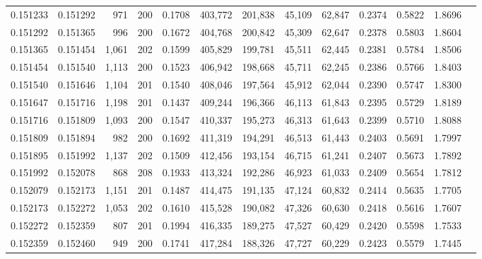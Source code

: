 \begin{tabular}{rrrrrrrrrrrrr}
0.151233 & 0.151292 &   971 & 200 &                                     0.1708 & 403,772 & 201,838 &  45,109 &  62,847 & 0.2374 & 0.5822 & 1.8696 \\
0.151292 & 0.151365 &   996 & 200 &                                     0.1672 & 404,768 & 200,842 &  45,309 &  62,647 & 0.2378 & 0.5803 & 1.8604 \\
0.151365 & 0.151454 & 1,061 & 202 &                                     0.1599 & 405,829 & 199,781 &  45,511 &  62,445 & 0.2381 & 0.5784 & 1.8506 \\
0.151454 & 0.151540 & 1,113 & 200 &                                     0.1523 & 406,942 & 198,668 &  45,711 &  62,245 & 0.2386 & 0.5766 & 1.8403 \\
0.151540 & 0.151646 & 1,104 & 201 &                                     0.1540 & 408,046 & 197,564 &  45,912 &  62,044 & 0.2390 & 0.5747 & 1.8300 \\
0.151647 & 0.151716 & 1,198 & 201 &                                     0.1437 & 409,244 & 196,366 &  46,113 &  61,843 & 0.2395 & 0.5729 & 1.8189 \\
0.151716 & 0.151809 & 1,093 & 200 &                                     0.1547 & 410,337 & 195,273 &  46,313 &  61,643 & 0.2399 & 0.5710 & 1.8088 \\
0.151809 & 0.151894 &   982 & 200 &                                     0.1692 & 411,319 & 194,291 &  46,513 &  61,443 & 0.2403 & 0.5691 & 1.7997 \\
0.151895 & 0.151992 & 1,137 & 202 &                                     0.1509 & 412,456 & 193,154 &  46,715 &  61,241 & 0.2407 & 0.5673 & 1.7892 \\
0.151992 & 0.152078 &   868 & 208 &                                     0.1933 & 413,324 & 192,286 &  46,923 &  61,033 & 0.2409 & 0.5654 & 1.7812 \\
0.152079 & 0.152173 & 1,151 & 201 &                                     0.1487 & 414,475 & 191,135 &  47,124 &  60,832 & 0.2414 & 0.5635 & 1.7705 \\
0.152173 & 0.152272 & 1,053 & 202 &                                     0.1610 & 415,528 & 190,082 &  47,326 &  60,630 & 0.2418 & 0.5616 & 1.7607 \\
0.152272 & 0.152359 &   807 & 201 &                                     0.1994 & 416,335 & 189,275 &  47,527 &  60,429 & 0.2420 & 0.5598 & 1.7533 \\
0.152359 & 0.152460 &   949 & 200 &                                     0.1741 & 417,284 & 188,326 &  47,727 &  60,229 & 0.2423 & 0.5579 & 1.7445 \\

\end{tabular}
